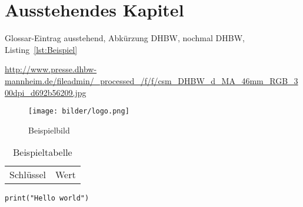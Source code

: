 \section{Ausstehendes Kapitel}

Glossar\hyp{}Eintrag \gls{ausstehend}, Abkürzung \ac{DHBW}, nochmal \ac{DHBW}, Listing~\ref{lst:Beispiel}

\begin{sloppypar}
\url{http://www.presse.dhbw-mannheim.de/fileadmin/_processed_/f/f/csm_DHBW_d_MA_46mm_RGB_300dpi_d692b56209.jpg} %
\end{sloppypar}


\begin{figure}
    \caption{Beispielbild}
    \texttt{[image: bilder/logo.png]}
\end{figure}

\begin{table}
    \caption{Beispieltabelle}
    \begin{tabular}{ll}
        Schlüssel&Wert
    \end{tabular}
\end{table}

\begin{lstfloat}
\begin{lstlisting}
print("Hello world")
\end{lstlisting}
\end{lstfloat}
